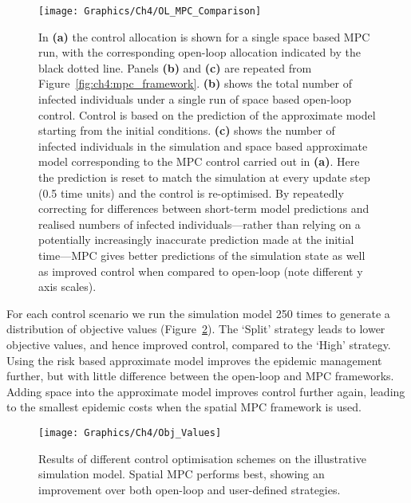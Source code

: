 \begin{figure}[h]
    \begin{center}
        \texttt{[image: Graphics/Ch4/OL\_MPC\_Comparison]}
        \caption[Comparing open-loop and MPC optimal strategies]{In \textbf{(a)} the control allocation is shown for a single space based MPC run, with the corresponding open-loop allocation indicated by the black dotted line. Panels \textbf{(b)} and \textbf{(c)} are repeated from Figure~\ref{fig:ch4:mpc_framework}. \textbf{(b)} shows the total number of infected individuals under a single run of space based open-loop control. Control is based on the prediction of the approximate model starting from the initial conditions. \textbf{(c)} shows the number of infected individuals in the simulation and space based approximate model corresponding to the MPC control carried out in \textbf{(a)}. Here the prediction is reset to match the simulation at every update step (0.5 time units) and the control is re-optimised. By repeatedly correcting for differences between short-term model predictions and realised numbers of infected individuals---rather than relying on a potentially increasingly inaccurate prediction made at the initial time---MPC gives better predictions of the simulation state as well as improved control when compared to open-loop (note different y axis scales).}
        \label{fig:ch4:ol_mpc_comparison}
    \end{center}
\end{figure}

For each control scenario we run the simulation model 250 times to generate a distribution of objective values (Figure~\ref{fig:ch4:obj_values}). The `Split' strategy leads to lower objective values, and hence improved control, compared to the `High' strategy. Using the risk based approximate model improves the epidemic management further, but with little difference between the open-loop and MPC frameworks. Adding space into the approximate model improves control further again, leading to the smallest epidemic costs when the spatial MPC framework is used.

\begin{figure}[h]
    \begin{center}
        \texttt{[image: Graphics/Ch4/Obj\_Values]}
        \caption[Comparing control strategy performance on the network model]{Results of different control optimisation schemes on the illustrative simulation model. Spatial MPC performs best, showing an improvement over both open-loop and user-defined strategies.}
        \label{fig:ch4:obj_values}
    \end{center}
\end{figure}

